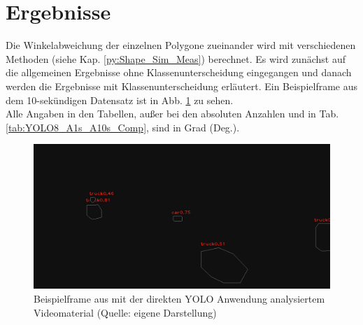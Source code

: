\section{Ergebnisse}
{ Die Winkelabweichung der einzelnen Polygone zueinander wird mit verschiedenen Methoden  (siehe Kap. \ref{py:Shape_Sim_Meas}) berechnet. Es wird zunächst auf die allgemeinen Ergebnisse ohne Klassenunterscheidung eingegangen und danach werden die Ergebnisse mit Klassenunterscheidung erläutert. Ein Beispielframe aus dem 10-sekündigen Datensatz ist in Abb. \ref{Bsp_ErgebRVA10s_Vidmat} zu sehen.\\
Alle Angaben in den Tabellen, außer bei den absoluten Anzahlen und in Tab. \ref{tab:YOLO8_A1s_A10s_Comp}, sind in Grad (Deg.).}
\begin{figure}[ht]
	\centering
	\includegraphics*[scale = 0.35, keepaspectratio ]{images/Evaluation/Screenshot_A10s_RV.png}
	\caption{Beispielframe aus mit der direkten YOLO Anwendung analysiertem Videomaterial (Quelle: eigene Darstellung)} 
	\label{Bsp_ErgebRVA10s_Vidmat}
\end{figure}
